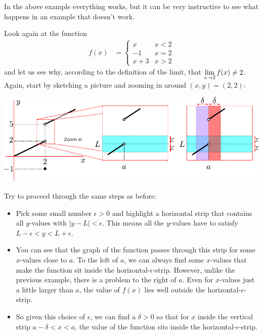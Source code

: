 In the above example everything works, but it can be very instructive to see
what happens in an example that doesn't work.
\begin{eg}
Look again at the function
\begin{align*}
  f(x) &= \begin{cases}
           x & x<2 \\
           -1 & x=2 \\
           x+3 & x>2
          \end{cases}
\end{align*}
and let us see why, according to the definition of the limit, that $\displaystyle \lim_{x
\to 2} f(x) \neq 2$. Again, start by sketching a picture and zooming in around
$(x,y) = (2,2)$:
\begin{efig}
\begin{center}
 \includegraphics[width=\textwidth]{epsdelt2}
\end{center}
\end{efig}
Try to proceed through the same steps as before:
\begin{itemize}
 \item Pick some small number $\epsilon>0$ and highlight a horizontal
strip that  contains all $y$-values with $|y-L|<\epsilon$. This means all
the $y$-values have to satisfy $L-\epsilon < y < L+\epsilon$.

\item You can see that the graph of the function passes through this strip for
some $x$-values close to $a$. To the left of $a$, we can always find some
$x$-values that make the function sit inside the horizontal-$\epsilon$-strip.
However, unlike the previous example, there is a problem to the right of $a$.
Even for $x$-values just a little larger than $a$, the value of $f(x)$ lies
well
outside the horizontal-$\epsilon$-strip.

\item So given this choice of $\epsilon$, we can find a $\delta>0$ so that for
$x$ inside the vertical strip $a-\delta < x < a$, the value of the function sits
inside the horizontal-$\epsilon$-strip.


\end{itemize}
\end{eg}
